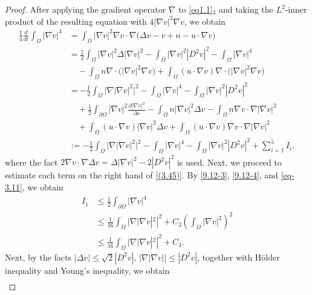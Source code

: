 \documentclass[10pt,a4paper]{amsart}
\numberwithin{equation}{section}
\begin{document}
\begin{proof}
After applying the gradient operator $\nabla$ to \eqref{eq1.1}$_3$ and taking the 
$L^2$-inner product of the resulting equation with $4|\nabla v|^2\nabla v$, we obtain
\begin{equation}\label{(3.45)}
\begin{aligned}
\frac{1}{4} \frac{d}{dt}  \int_{\Omega} | \nabla v |^4
&= \int_{\Omega} |\nabla v|^2 \nabla v \cdot \nabla \bigl( \Delta v - v + n - u \cdot \nabla v \bigr) \\
&= \frac{1}{2} \int_{\Omega} |\nabla v|^2 \Delta |\nabla v|^2
  - \int_{\Omega} |\nabla v|^2 |D^2 v|^2
  - \int_{\Omega} |\nabla v|^4 \\
&\quad- \int_{\Omega} n \nabla \cdot \bigl( |\nabla v|^2 \nabla v \bigr)
  + \int_{\Omega} (u \cdot \nabla v) \nabla \cdot \bigl( |\nabla v|^2 \nabla v \bigr) \\
&= -\frac{1}{2} \int_{\Omega} \bigl| \nabla |\nabla v|^2 \bigr|^2- \int_{\Omega} |\nabla v|^4 - \int_{\Omega} |\nabla v|^2 |D^2 v|^2 \\
&\quad + \frac{1}{2} \int_{\partial \Omega} |\nabla v|^2 \frac{\partial |\nabla v|^2}{\partial \nu}
  - \int_{\Omega} n |\nabla v|^2 \Delta v
  - \int_{\Omega} n \nabla v \cdot \nabla |\nabla v|^2\\
&\quad+ \int_{\Omega} (u \cdot \nabla v) |\nabla v|^2 \Delta v
  + \int_{\Omega} (u \cdot \nabla v) \nabla v \cdot \nabla |\nabla v|^2\\&:=-\frac{1}{2} \int_{\Omega} \bigl| \nabla |\nabla v|^2 \bigr|^2-
  \int_{\Omega} |\nabla v|^4 - \int_{\Omega} |\nabla v|^2 |D^2 v|^2 +\sum_{i=1}^{5}I_i,
\end{aligned}
\end{equation}
where the fact $ 2\nabla v \cdot \nabla \Delta v = \Delta | \nabla v |^2
- 2 | D^2 v |^2 $ is used.
Next, we proceed to estimate each term on the right hand of \eqref{(3.45)}. 
By \eqref{9.12-3}, \eqref{9.12-4}, and \eqref{eq-3.11}, we obtain
\begin{align*}
I_1 &\leq \frac{1}{2}\int_{\partial \Omega} |\nabla v|^4  \\ &\leq \frac{1}{16}\int_{\Omega} |\nabla |\nabla v|^2|^2 + C_3\left(\int_{\Omega} |\nabla v|^2\right)^2
\\
&\leq \frac{1}{16}\int_{\Omega} |\nabla |\nabla v|^2|^2 + C_4.
\end{align*}
Next, by  the facts $ |\Delta v| \leq \sqrt{2} |D^2 v|$, 
$|\nabla|\nabla v||\leq |D^2 v|$, together with H\"{o}lder inequality and Young's 
inequality, we obtain
\begin{align*}

\end{align*}
\end{proof}
\end{document}
